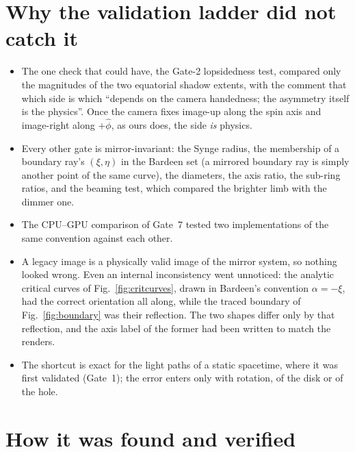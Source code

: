 \section{Why the validation ladder did not catch it}
\label{sec:hand-why}

\begin{itemize}
\item The one check that could have, the Gate-2 lopsidedness test,
compared only the magnitudes of the two equatorial shadow extents, with
the comment that which side is which ``depends on the camera
handedness; the asymmetry itself is the physics''. Once the camera fixes
image-up along the spin axis and image-right along $+\hat\phi$, as ours
does, the side \emph{is} physics.
\item Every other gate is mirror-invariant: the Synge radius, the
membership of a boundary ray's $(\xi, \eta)$ in the Bardeen set (a
mirrored boundary ray is simply another point of the same curve), the
diameters, the axis ratio, the sub-ring ratios, and the beaming test,
which compared the brighter limb with the dimmer one.
\item The CPU--GPU comparison of Gate~7 tested two implementations of
the same convention against each other.
\item A legacy image is a physically valid image of the mirror system,
so nothing looked wrong. Even an internal inconsistency went
unnoticed: the analytic critical curves of Fig.~\ref{fig:critcurves},
drawn in Bardeen's convention $\alpha = -\xi$, had the correct
orientation all along, while the traced boundary of
Fig.~\ref{fig:boundary} was their reflection. The two shapes differ
only by that reflection, and the axis label of the former had been
written to match the renders.
\item The shortcut is exact for the light paths of a static spacetime,
where it was first validated (Gate~1); the error enters only with
rotation, of the disk or of the hole.
\end{itemize}

\section{How it was found and verified}
\label{sec:hand-found}

